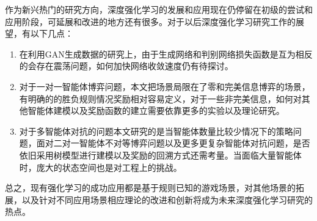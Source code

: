 作为新兴热门的研究方向，深度强化学习的发展和应用现在仍停留在初级的尝试和应用阶段，可延展和改进的地方还有很多。对于以后深度强化学习研究工作的展望，有以下几点：
\begin{enumerate}
	\item 在利用GAN生成数据的研究上，由于生成网络和判别网络损失函数是互为相反的会存在震荡问题，如何加快网络收敛速度仍有待探讨。
	\item 对于一对一智能体博弈问题，本文把场景局限在了零和完美信息博弈的场景，有明确的的胜负规则情况奖励相对容易定义，对于一些非完美信息，如何对其他智能体建模以及奖励函数的建立需要依靠更多的实验以及理论研究。
	\item 对于多智能体对抗的问题本文研究的是当智能体数量比较少情况下的策略问题，面对二对一智能体不对等博弈问题以及更多更复杂智能体对抗问题，是否依旧采用树模型进行建模以及奖励的回溯方式还需考量。当面临大量智能体时，庞大的状态空间也是对工程上的挑战。
\end{enumerate}

总之，现有强化学习的成功应用都是基于规则已知的游戏场景，对其他场景的拓展，以及针对不同应用场景相应理论的改进和创新将成为未来深度强化学习研究的热点。